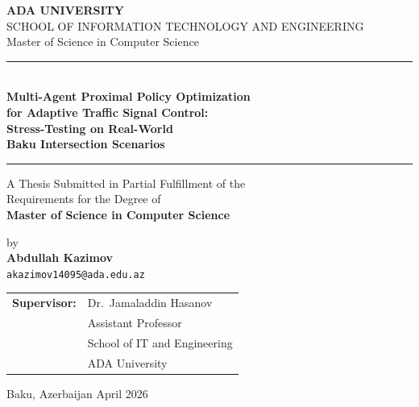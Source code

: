 \documentclass[12pt,oneside,a4paper]{report}
\begin{document}
\sloppy
\pagestyle{fancy}

\begin{titlepage}
  \begin{center}
    \vspace*{0.2in}
    {\Large\bfseries ADA UNIVERSITY}\\[6pt]
    {\large SCHOOL OF INFORMATION TECHNOLOGY AND ENGINEERING}\\[2pt]
    {\normalsize Master of Science in Computer Science}

    \vspace{0.6in}
    \rule{\textwidth}{1.5pt}\\[8pt]
    {\LARGE\bfseries
      Multi-Agent Proximal Policy Optimization\\[4pt]
      for Adaptive Traffic Signal Control:\\[4pt]
      Stress-Testing on Real-World\\[4pt]
      Baku Intersection Scenarios}\\[8pt]
    \rule{\textwidth}{1.5pt}

    \vspace{0.6in}
    {\normalsize
      A Thesis Submitted in Partial Fulfillment of the\\
      Requirements for the Degree of\\[6pt]
      \textbf{Master of Science in Computer Science}}

    \vspace{0.6in}
    {\normalsize by}\\[8pt]
    {\Large\bfseries Abdullah Kazimov}\\[4pt]
    {\normalsize \texttt{akazimov14095@ada.edu.az}}

    \vspace{0.6in}
    \begin{tabular}{rl}
      \textbf{Supervisor:} & Dr.\ Jamaladdin Hasanov \\
                           & Assistant Professor      \\
                           & School of IT and Engineering \\
                           & ADA University           \\
    \end{tabular}

    \vfill
    {\normalsize Baku, Azerbaijan \hfill April 2026}
  \end{center}
\thispagestyle{fancy}
\end{titlepage}
\setcounter{page}{2}
\end{document}
